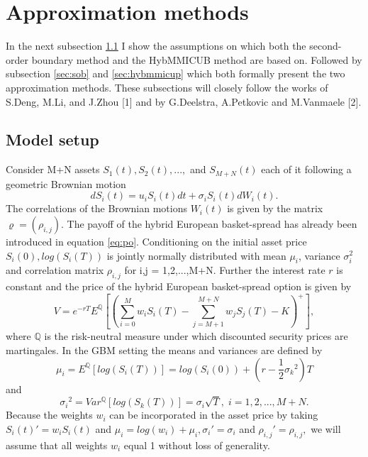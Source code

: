 \documentclass[a4paper]{article}
\begin{document}
\newpage
\section{Approximation methods}
\label{sec:am}
In the next subsection \ref{sec:ms} I show the assumptions on which both the second-order boundary method and the HybMMICUB method are based on. Followed by subsection \ref{sec:sob} and \ref{sec:hybmmicup} which both formally present the two approximation methods. These subsections will closely follow the works of S.Deng, M.Li, and J.Zhou [1] and by G.Deelstra, A.Petkovic and M.Vanmaele [2].

\subsection{Model setup}
\label{sec:ms}
Consider M+N assets $S_1(t), S_2(t), ...,$ and $S_{M+N}(t)$ each of it following a geometric Brownian motion
$$dS_i(t) = u_iS_i(t)dt + \sigma_iS_i(t)dW_i(t).$$
The correlations of the Brownian motions $W_i(t)$ is given by the matrix $\varrho=(\rho_{i,j})$. 
The payoff of the hybrid European basket-spread has already been introduced in equation \ref{eq:po}. Conditioning on the initial asset price $S_i(0), log(S_i(T))$ is jointly normally distributed with mean $\mu_i$, variance $\sigma_i^2$ and correlation matrix $\rho_{i,j}$ for i,j = 1,2,...,M+N. 
Further the interest rate $r$ is constant and the price of the hybrid European basket-spread option is given by
\begin{equation}
\label{eq:mg}
V = e^{-rT}E^{\mathbb{Q}}[(\sum_{i=0}^M w_iS_i(T) - \sum_{j=M+1}^{M+N} w_jS_j(T) - K)^+],
\end{equation}
where $\mathbb{Q}$ is the risk-neutral measure under which discounted security prices are martingales.
In the GBM setting the means and variances are defined by 
$$\mu_i = E^\mathbb{Q}[log(S_i(T))] = log(S_i(0)) + (r-\frac{1}{2}{\sigma_k}^2)T$$ 
and
$${\sigma_i}^2 = Var^\mathbb{Q}[log(S_k(T))] = \sigma_i\sqrt{T}, \; i=1,2,...,M+N.$$
Because the weights $w_i$ can be incorporated in the asset price by taking $S_i(t)'=w_iS_i(t)$ and $\mu_i=log(w_i)+\mu_i, \sigma_i'=\sigma_i$ and $\rho_{i,j}'=\rho_{i,j},$ we will assume that all weights $w_i$ equal 1 without loss of generality.
\end{document}
